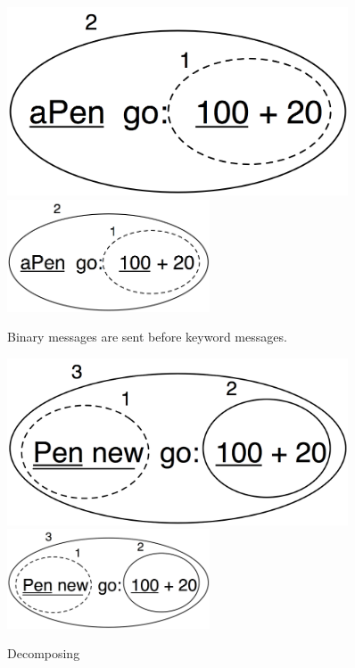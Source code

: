 \documentclass[a4paper,10pt,twoside]{book}
\begin{document}
\begin{figure}[htb]
\begin{minipage}{0.48\textwidth}
	\ifluluelse
		{\centerline{\includegraphics[width=0.9\textwidth]{uKeyBin}}}
		{\centerline{\includegraphics[width=6cm]{uKeyBin}}}
	\caption{Binary messages are sent before keyword messages.}
\end{minipage}
\hfill
\begin{minipage}{0.48\textwidth}
	\begin{center}
	\ifluluelse
		{\includegraphics[width=0.9\textwidth]{uunKeyBin}}
		{\includegraphics[width=6cm]{uunKeyBin}}
\caption{Decomposing }
\end{center}
\end{minipage}
\end{figure}
\end{document}
